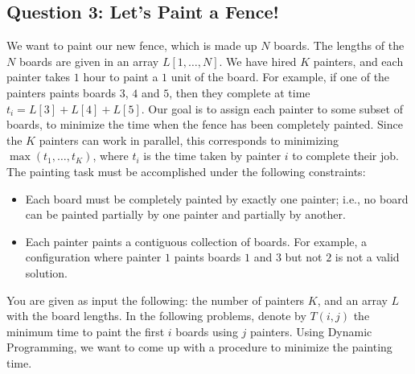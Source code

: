 \subsection*{Question 3: Let's Paint a Fence!}
We want to paint our new fence, which is made up $N$ boards. The
lengths of the $N$ boards are given in an array
$L[1,\ldots,N]$. We have hired $K$ painters, and
each painter takes $1$ hour to paint a $1$ unit of the board. For example,
if one of the painters paints boards $3$, $4$ and $5$, then they
complete at time $t_i=L[3]+L[4]+L[5]$. Our goal is to assign each
painter to some subset of boards, to minimize the time when the fence
has been completely painted. Since the $K$ painters can work in
parallel, this corresponds to minimizing $\max(t_1,\ldots,t_K)$, where
$t_i$ is the time taken by painter $i$ to complete their job. The
painting task must be accomplished under the following constraints:
\begin{itemize}
    \item Each board must be completely painted by exactly one painter;
      i.e., no board can be painted partially by one painter and partially
      by another.
    \item Each painter paints a contiguous collection of boards.  For example, a
      configuration where painter $1$ paints boards $1$ and $3$ but not
      $2$ is not a valid solution.
\end{itemize}
You are given as input the following: the number of painters $K$, and
an array $L$ with the board lengths.  In the following problems,
denote by $T(i,j)$ the minimum time to paint the first $i$ boards using
$j$ painters. Using Dynamic Programming, we want to come up with a procedure 
to minimize the painting time.
